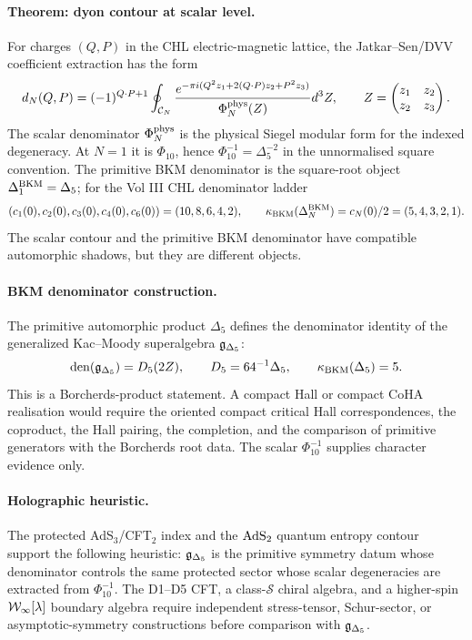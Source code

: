 \paragraph{Theorem: dyon contour at scalar level.}
For charges $(Q,P)$ in the CHL electric-magnetic lattice, the
Jatkar--Sen/DVV coefficient extraction has the form
\[
  d_N(Q,P)
  =
  (-1)^{Q\cdot P+1}
  \oint_{\mathcal C_N}
  \frac{
  e^{-\pi i(Q^2 z_1+2(Q\cdot P)z_2+P^2 z_3)}
  }{\Phi^{\mathrm{phys}}_N(Z)}
  d^3Z ,
  \qquad
  Z=\begin{pmatrix}z_1&z_2\\ z_2&z_3\end{pmatrix}.
\]
The scalar denominator $\Phi^{\mathrm{phys}}_N$ is the physical Siegel modular form
for the indexed degeneracy. At $N=1$ it is $\Phi_{10}$, hence
$\Phi_{10}^{-1}=\Delta_5^{-2}$ in the unnormalised square convention.
The primitive BKM denominator is the square-root object
$\Delta^{\mathrm{BKM}}_1=\Delta_5$; for the Vol III CHL denominator ladder
\[
  (c_1(0),c_2(0),c_3(0),c_4(0),c_6(0))=(10,8,6,4,2),
  \qquad
  \kappa_{\mathrm{BKM}}(\Delta^{\mathrm{BKM}}_N)=c_N(0)/2=(5,4,3,2,1).
\]
The scalar contour and the primitive BKM denominator have compatible
automorphic shadows, but they are different objects.

\paragraph{BKM denominator construction.}
The primitive automorphic product $\Delta_5$ defines the denominator
identity of the generalized Kac--Moody superalgebra
$\mathfrak{g}_{\Delta_5}$:
\[
  \operatorname{den}(\mathfrak{g}_{\Delta_5})=D_5(2Z),
  \qquad D_5=64^{-1}\Delta_5,
  \qquad \kappa_{\mathrm{BKM}}(\Delta_5)=5.
\]
This is a Borcherds-product statement. A compact Hall or compact CoHA
realisation would require the oriented compact critical Hall
correspondences, the coproduct, the Hall pairing, the completion, and
the comparison of primitive generators with the Borcherds root data.
The scalar $\Phi_{10}^{-1}$ supplies character evidence only.

\paragraph{Holographic heuristic.}
The protected AdS$_3$/CFT$_2$ index and the $\mathrm{AdS}_2$ quantum entropy
contour support the following heuristic: $\mathfrak{g}_{\Delta_5}$ is the
primitive symmetry datum whose denominator controls the same protected
sector whose scalar degeneracies are extracted from $\Phi_{10}^{-1}$.
The D1--D5 CFT, a class-$\mathcal S$ chiral algebra, and a higher-spin
$\mathcal{W}_\infty[\lambda]$ boundary algebra require independent stress-tensor,
Schur-sector, or asymptotic-symmetry constructions before comparison
with $\mathfrak{g}_{\Delta_5}$.

